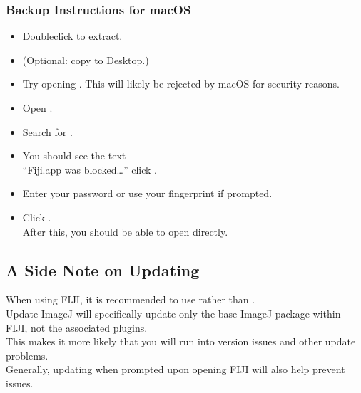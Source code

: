 \documentclass[letterpaper,10pt,english]{jupyterBook}
\begin{document}
\subsubsection{Backup Instructions for macOS}
\label{\detokenize{installation:backup-instructions-for-macos}}\begin{itemize}
\item {} 
\sphinxAtStartPar
Double\sphinxhyphen{}click  to extract.

\item {} 
\sphinxAtStartPar
(Optional: copy  to Desktop.)

\item {} 
\sphinxAtStartPar
Try opening  .
This will likely be rejected by macOS for security reasons.

\item {} 
\sphinxAtStartPar
Open .

\item {} 
\sphinxAtStartPar
Search for .

\item {} 
\sphinxAtStartPar
You should see the text\\
“Fiji.app was blocked…” \sphinxhyphen{} click .

\item {} 
\sphinxAtStartPar
Enter your password or use your fingerprint if prompted.

\item {} 
\sphinxAtStartPar
Click .\\
After this, you should be able to open  directly.

\end{itemize}


\subsection{A Side Note on Updating}
\label{\detokenize{installation:a-side-note-on-updating}}
\sphinxAtStartPar
When using FIJI, it is recommended to use  rather than .\\
Update ImageJ will specifically update only the base ImageJ package within FIJI, not the associated plugins.\\
This makes it more likely that you will run into version issues and other update problems.\\
Generally, updating when prompted upon opening FIJI will also help prevent issues.
\end{document}
